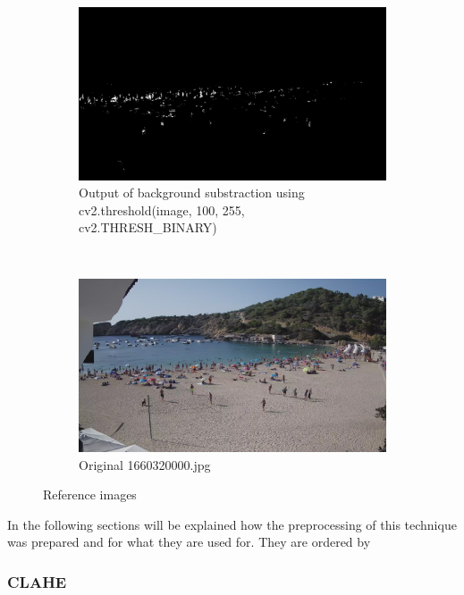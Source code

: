 \documentclass[10pt]{article}
\begin{document}
\begin{figure}[h]
  \begin{subfigure}[t]{0.5\textwidth}
    \centering
    \includegraphics[width=\textwidth]{img/bin_ex.jpg}
    \caption{Output of background substraction using cv2.threshold(image, 100, 255, cv2.THRESH\_BINARY)}
    \label{fig:y equals x}
  \end{subfigure}
  ~
  \begin{subfigure}[t]{0.5\textwidth}
    \centering
    \includegraphics[width=\textwidth]{img/or_ex.jpg}
    \caption{Original 1660320000.jpg}
    \label{fig:y equals x}
  \end{subfigure}

  \caption{Reference images}
  \label{fig: img_reference}
\end{figure}
\FloatBarrier
In the following sections will be explained how the preprocessing of this technique was prepared and for what they are used for. They are ordered by

\subsubsection*{CLAHE}
\end{document}
